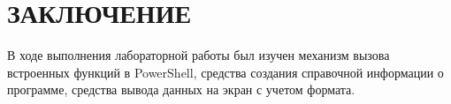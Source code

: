 \section*{ЗАКЛЮЧЕНИЕ}

В ходе выполнения лабораторной работы был изучен механизм вызова
встроенных функций в PowerShell, средства создания справочной информации
о программе, средства вывода данных на экран с учетом формата.

\newpage
